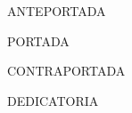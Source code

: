 \documentclass{article}
\begin{document}
\newpage\phantom{blabla}\thispagestyle{empty}
\newpage\phantom{blabla}\thispagestyle{empty}
\newpage\phantom{blabla}\thispagestyle{empty}
\begin{titlepage}\thispagestyle{empty}
{\scshape\Huge ANTEPORTADA \par}
\end{titlepage}
\newpage\phantom{blabla}\thispagestyle{empty}
\begin{titlepage}\thispagestyle{empty}
{\scshape\Huge PORTADA \par}
\end{titlepage}
\begin{titlepage}\thispagestyle{empty}
{\scshape\Huge CONTRAPORTADA \par}
\end{titlepage}
\begin{titlepage}\thispagestyle{empty}
{\scshape\Huge DEDICATORIA \par}
\end{titlepage}
\newpage\phantom{blabla}\thispagestyle{empty}
\end{document}
